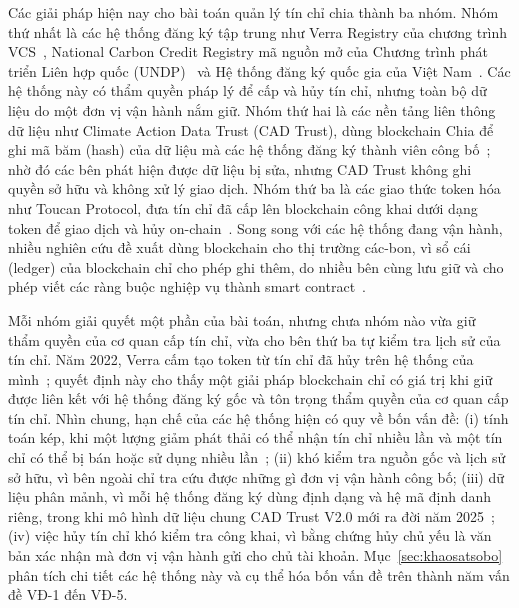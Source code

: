 Các giải pháp hiện nay cho bài toán quản lý tín chỉ chia thành ba nhóm. Nhóm thứ nhất là các hệ thống đăng ký tập trung như Verra Registry của chương trình VCS~\cite{verra2024vcs}, National Carbon Credit Registry mã nguồn mở của Chương trình phát triển Liên hợp quốc (UNDP)~\cite{undp2024nationalregistry} và Hệ thống đăng ký quốc gia của Việt Nam~\cite{vietnam2026thongtu11}. Các hệ thống này có thẩm quyền pháp lý để cấp và hủy tín chỉ, nhưng toàn bộ dữ liệu do một đơn vị vận hành nắm giữ. Nhóm thứ hai là các nền tảng liên thông dữ liệu như Climate Action Data Trust (CAD Trust), dùng blockchain Chia để ghi mã băm (hash) của dữ liệu mà các hệ thống đăng ký thành viên công bố~\cite{cadtrust2025datamodel}; nhờ đó các bên phát hiện được dữ liệu bị sửa, nhưng CAD Trust không ghi quyền sở hữu và không xử lý giao dịch. Nhóm thứ ba là các giao thức token hóa như Toucan Protocol, đưa tín chỉ đã cấp lên blockchain công khai dưới dạng token để giao dịch và hủy on-chain~\cite{toucan2025docs}. Song song với các hệ thống đang vận hành, nhiều nghiên cứu đề xuất dùng blockchain cho thị trường các-bon, vì sổ cái (ledger) của blockchain chỉ cho phép ghi thêm, do nhiều bên cùng lưu giữ và cho phép viết các ràng buộc nghiệp vụ thành smart contract~\cite{kim2020blockchain,sipthorpe2022blockchain}.

Mỗi nhóm giải quyết một phần của bài toán, nhưng chưa nhóm nào vừa giữ thẩm quyền của cơ quan cấp tín chỉ, vừa cho bên thứ ba tự kiểm tra lịch sử của tín chỉ. Năm 2022, Verra cấm tạo token từ tín chỉ đã hủy trên hệ thống của mình~\cite{verra2022crypto}; quyết định này cho thấy một giải pháp blockchain chỉ có giá trị khi giữ được liên kết với hệ thống đăng ký gốc và tôn trọng thẩm quyền của cơ quan cấp tín chỉ. Nhìn chung, hạn chế của các hệ thống hiện có quy về bốn vấn đề: (i) tính toán kép, khi một lượng giảm phát thải có thể nhận tín chỉ nhiều lần và một tín chỉ có thể bị bán hoặc sử dụng nhiều lần~\cite{schneider2019double}; (ii) khó kiểm tra nguồn gốc và lịch sử sở hữu, vì bên ngoài chỉ tra cứu được những gì đơn vị vận hành công bố; (iii) dữ liệu phân mảnh, vì mỗi hệ thống đăng ký dùng định dạng và hệ mã định danh riêng, trong khi mô hình dữ liệu chung CAD Trust V2.0 mới ra đời năm 2025~\cite{cadtrust2025datamodel}; (iv) việc hủy tín chỉ khó kiểm tra công khai, vì bằng chứng hủy chủ yếu là văn bản xác nhận mà đơn vị vận hành gửi cho chủ tài khoản. Mục~\ref{sec:khaosatsobo} phân tích chi tiết các hệ thống này và cụ thể hóa bốn vấn đề trên thành năm vấn đề VĐ-1 đến VĐ-5.

